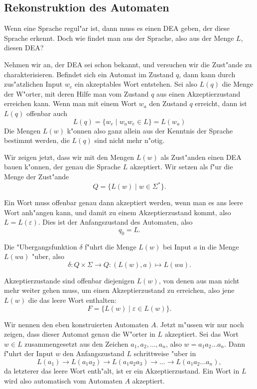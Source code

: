 \subsection{Rekonstruktion des Automaten\label{regulaer:rekonstruktion}}
Wenn eine Sprache regul"ar ist, dann muss es einen DEA geben, der
diese Sprache erkennt. Doch wie findet man aus der Sprache, also 
aus der Menge $L$, diesen DEA?

Nehmen wir an, der DEA sei schon bekannt, und versuchen wir
die Zust"ande zu charakterisieren. Befindet sich ein Automat
im Zustand $q$, dann kann durch zus"atzlichen Input $w_e$ ein
akzeptables Wort entstehen. Sei also
$L(q)$ die Menge der W"orter, mit deren Hilfe man vom Zustand $q$
aus einen Akzeptierzustand erreichen kann. Wenn man mit einem Wort
$w_a$ den Zustand $q$ erreicht, dann ist $L(q)$ offenbar auch
\[
L(q)=\{ w_e\;|\; w_aw_e \in L\}= L(w_a)
\]
Die Mengen $L(w)$ k"onnen also ganz allein aus der Kenntnis der
Sprache bestimmt werden, die $L(q)$ sind nicht mehr n"otig.

Wir zeigen jetzt, dass wir mit den Mengen $L(w)$ als Zust"anden einen
DEA bauen k"onnen, der genau die Sprache $L$ akzeptiert.
Wir setzen als f"ur die Menge der Zust"ande 
\[
Q=\{L(w)\;|\;w\in\Sigma^*\}.
\]

Ein Wort muss offenbar genau dann akzeptiert werden, wenn
man es ans leere Wort anh"angen kann, und damit zu einem Akzeptierzustand
kommt, also $L=L(\varepsilon)$. Dies ist der Anfangszustand des Automaten,
also
\[
q_0=L.
\]

Die "Ubergangsfunktion $\delta$ f"uhrt die Menge $L(w)$ bei Input
$a$ in die Menge $L(wa)$ "uber, also
\[
\delta \colon Q\times\Sigma\to Q:(L(w),a)\mapsto L(wa).
\]

Akzeptierzustande sind offenbar diejenigen $L(w)$, von denen
aus man nicht mehr weiter gehen muss, um einen Akzeptierzustand
zu erreichen, also jene $L(w)$ die das leere Wort enthalten:
\[
F=\{L(w)\;|\;\varepsilon\in L(w)\}.
\]

Wir nennen den eben konstruierten Automaten $A$.
Jetzt m"ussen wir nur noch zeigen, dass dieser Automat genau die
W"orter in $L$ akzeptiert.
Sei das Wort $w\in L$ zusammengesetzt aus den
Zeichen $a_1,a_2,\dots,a_n$, also $w=a_1a_2\dots a_n$. Dann f"uhrt
der Input $w$ den Anfangszustand $L$ schrittweise "uber in
\[
L(a_1)\to L(a_1a_2)\to L(a_1a_2a_3)\to \dots \to L(a_1a_2\dots a_n),
\]
da letzterer das leere Wort enth"alt, ist er ein Akzeptierzustand.
Ein Wort in $L$ wird also automatisch vom Automaten $A$ akzeptiert.

